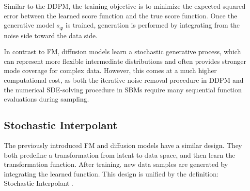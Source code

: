 Similar to the \ac{DDPM}, the training objective is to minimize the expected squared error between the learned score function and the true score function. Once the generative model $s_{\boldsymbol{\varphi}}$ is trained, generation is performed by integrating from the noise side toward the data side. 

In contrast to \ac{FM}, diffusion models learn a stochastic generative process, which can represent more flexible intermediate distributions and often provides stronger mode coverage for complex data. However, this comes at a much higher computational cost, as both the iterative noise-removal procedure in \ac{DDPM} and the numerical \ac{SDE}-solving procedure in \acp{SBM} require many sequential function evaluations during sampling.

\subsection{Stochastic Interpolant}\label{sec:background:si}
The previously introduced \ac{FM} and diffusion models have a similar design. They both predefine a transformation from latent to data space, and then learn the transformation function. After training, new data samples are generated by integrating the learned function. This design is unified by the definition: Stochastic Interpolant \citep{albergo2025si}.

